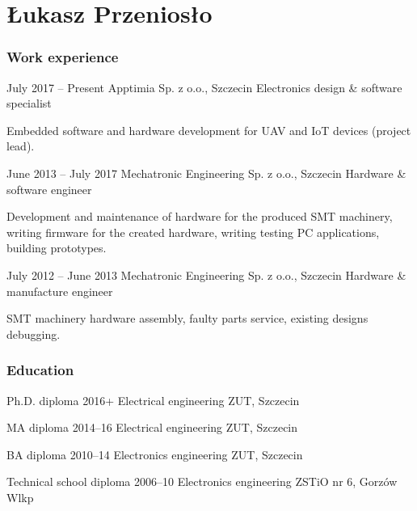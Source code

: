 \documentclass{tccv}
\begin{document}
\part{Łukasz Przeniosło}

\section{Work experience}

\begin{eventlist}

\item{July 2017 -- Present}
     {Apptimia Sp. z o.o., Szczecin}
     {Electronics design \& software specialist}
     
Embedded software and hardware development for UAV and IoT devices (project lead).

\item{June 2013 -- July 2017}
     {Mechatronic Engineering Sp. z o.o., Szczecin}
     {Hardware \& software engineer}
     
Development and maintenance of hardware for the produced SMT machinery, writing firmware for the created hardware, writing testing PC applications, building prototypes. 

\item{July 2012 -- June 2013}
     {Mechatronic Engineering Sp. z o.o., Szczecin}
     {Hardware \& manufacture engineer}

SMT machinery hardware assembly, faulty parts service, existing designs debugging. 

\end{eventlist}

\section{Education}

\begin{yearlist}

\item[Ph.D. diploma]{2016+}
     {Electrical engineering}
     {ZUT, Szczecin}

\item[MA diploma]{2014--16}
     {Electrical engineering}
     {ZUT, Szczecin}

\item[BA diploma]{2010--14}
     {Electronics engineering}
     {ZUT, Szczecin}

\item[Technical school diploma]{2006--10}
     {Electronics engineering}
     {ZSTiO nr 6, Gorzów Wlkp}

\end{yearlist}
\end{document}
